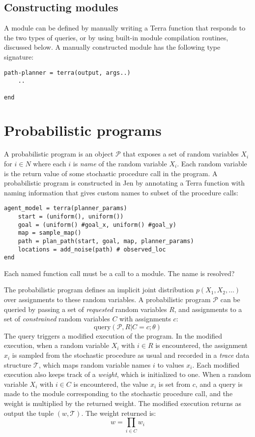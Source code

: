\documentclass{article}
\begin{document}
\subsection{Constructing modules}
A module can be defined by manually writing a Terra function that responds to the two types of queries, or by using built-in module compilation routines, discussed below.
A manually constructed module has the following type signature:
\begin{lstlisting}
path-planner = terra(output, args..)
    ..
    
end
\end{lstlisting}

\section{Probabilistic programs}
A probabilistic program is an object $\mathcal{P}$ that exposes a set of random variables $X_i$ for $i \in N$ where each $i$ is \emph{name} of the random variable $X_i$.
Each random variable is the return value of some stochastic procedure call in the program.
A probabilistic program is constructed in Jen by annotating a Terra function with naming information that gives custom names to subset of the procedure calls:
\begin{lstlisting}
agent_model = terra(planner_params)
    start = (uniform(), uniform())
    goal = (uniform() #goal_x, uniform() #goal_y)
    map = sample_map()
    path = plan_path(start, goal, map, planner_params)
    locations = add_noise(path) # observed_loc
end
\end{lstlisting}

Each named function call must be a call to a module.
The name is resolved?

The probabilistic program defines an implicit joint distribution $p(X_1,X_2,\ldots)$ over assignments to these random variables.
A probabilistic program $\mathcal{P}$ can be queried by passing a set of \emph{requested} random variables $R$, and assignments to a set of \emph{constrained} random variables $C$ with assignments $c$:
\begin{equation}
    \mbox{query}(\mathcal{P}, R | C = c ; \theta)
\end{equation}
The query triggers a modified execution of the program.
In the modified execution, when a random variable $X_i$ with $i \in R$ is encountered, the assignment $x_i$ is sampled from the stochastic procedure as usual and recorded in a \emph{trace} data structure $\mathcal{T}$, which maps random variable names $i$ to values $x_i$.
Each modified execution also keeps track of a \emph{weight}, which is initialized to one.
When a random variable $X_i$ with $i \in C$ is encountered, the value $x_i$ is set from $c$, and a query is made to the module corresponding to the stochastic procedure call, and the weight is multiplied by the returned weight.
The modified execution returns as output the tuple $(w, \mathcal{T})$.
The weight returned is:
\begin{equation}
w = \prod_{i \in C} w_i
\end{equation}
\end{document}
